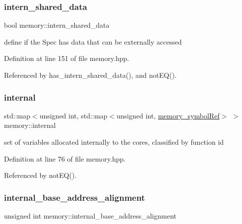 \subsubsection{\texorpdfstring{intern\+\_\+shared\+\_\+data}{intern\_shared\_data}}
{\footnotesize\ttfamily bool memory\+::intern\+\_\+shared\+\_\+data\hspace{0.3cm}{\ttfamily [private]}}



define if the Spec has data that can be externally accessed 



Definition at line 151 of file memory.\+hpp.



Referenced by has\+\_\+intern\+\_\+shared\+\_\+data(), and not\+E\+Q().

\mbox{\label{classmemory_af2efbd3f5b71e458681d8c971e2dfbee}} 
\subsubsection{\texorpdfstring{internal}{internal}}
{\footnotesize\ttfamily std\+::map$<$unsigned int, std\+::map$<$unsigned int, \hyperlink{memory__symbol_8hpp_af3608dbc27177447c2d777fa712cc82a}{memory\+\_\+symbol\+Ref}$>$ $>$ memory\+::internal\hspace{0.3cm}{\ttfamily [private]}}



set of variables allocated internally to the cores, classified by function id 



Definition at line 76 of file memory.\+hpp.



Referenced by not\+E\+Q().

\mbox{\label{classmemory_aae0423a2b0d67d6144694b6b41025141}} 
\subsubsection{\texorpdfstring{internal\+\_\+base\+\_\+address\+\_\+alignment}{internal\_base\_address\_alignment}}
{\footnotesize\ttfamily unsigned int memory\+::internal\+\_\+base\+\_\+address\+\_\+alignment\hspace{0.3cm}{\ttfamily [private]}}



